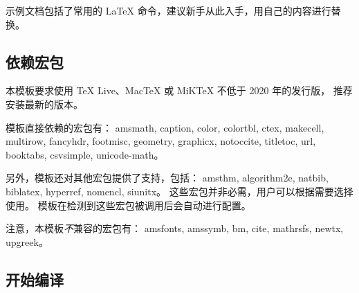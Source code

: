 \documentclass[a4paper]{ltxdoc}
\DeclareRobustCommand\pkg{\textsf}
\begin{document}
示例文档包括了常用的 \LaTeX{} 命令，建议新手从此入手，用自己的内容进行替换。


\subsection{依赖宏包}

本模板要求使用 TeX Live、MacTeX 或 MiKTeX 不低于 2020 年的发行版，
推荐安装最新的版本。

模板直接依赖的宏包有：
\pkg{amsmath},
\pkg{caption},
\pkg{color},
\pkg{colortbl},
\pkg{ctex},
\pkg{makecell},
\pkg{multirow},
\pkg{fancyhdr},
\pkg{footmisc},
\pkg{geometry},
\pkg{graphicx},
\pkg{notoccite},
\pkg{titletoc},
\pkg{url},
\pkg{booktabs},
\pkg{csvsimple},
\pkg{unicode-math}。

另外，模板还对其他宏包提供了支持，包括：
\pkg{amsthm},
\pkg{algorithm2e},
\pkg{natbib},
\pkg{biblatex},
\pkg{hyperref},
\pkg{nomencl},
\pkg{siunitx}。
这些宏包并非必需，用户可以根据需要选择使用。
模板在检测到这些宏包被调用后会自动进行配置。

注意，本模板\emph{不}兼容的宏包有：
\pkg{amsfonts},
\pkg{amssymb},
\pkg{bm},
\pkg{cite},
\pkg{mathrsfs},
\pkg{newtx},
\pkg{upgreek}。


\subsection{开始编译}
\end{document}
